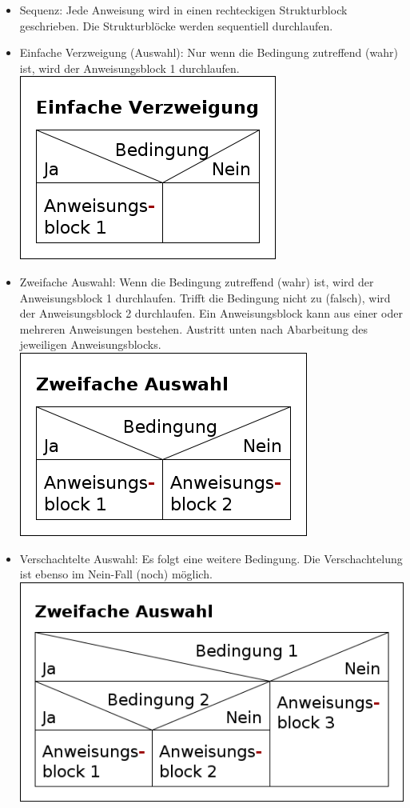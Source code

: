 \begin{itemize}
	\item Sequenz: Jede Anweisung wird in einen rechteckigen Strukturblock geschrieben. Die Strukturblöcke werden sequentiell durchlaufen.\\
	\item Einfache Verzweigung (Auswahl): Nur wenn die Bedingung zutreffend (wahr) ist, wird der Anweisungsblock 1 durchlaufen.\\
\includegraphics[scale=0.5]{1jahr_pictures/lf06prog-pic/lf06prog-einfache-auswahl-struct.png}
	\item Zweifache Auswahl: Wenn die Bedingung zutreffend (wahr) ist, wird der Anweisungsblock 1 durchlaufen. Trifft die Bedingung nicht zu (falsch), wird der Anweisungsblock 2 durchlaufen. Ein Anweisungsblock kann aus einer oder mehreren Anweisungen bestehen. Austritt unten nach Abarbeitung des jeweiligen Anweisungsblocks.\\
\includegraphics[scale=0.5]{1jahr_pictures/lf06prog-pic/lf06prog-zweifache-auswahl-struct.png}
	\item Verschachtelte Auswahl: Es folgt eine weitere Bedingung. Die Verschachtelung ist ebenso im Nein-Fall (noch) möglich.\\
\includegraphics[scale=0.5]{1jahr_pictures/lf06prog-pic/lf06prog-verschachtelte-auswahl-struct.png}

\end{itemize}
